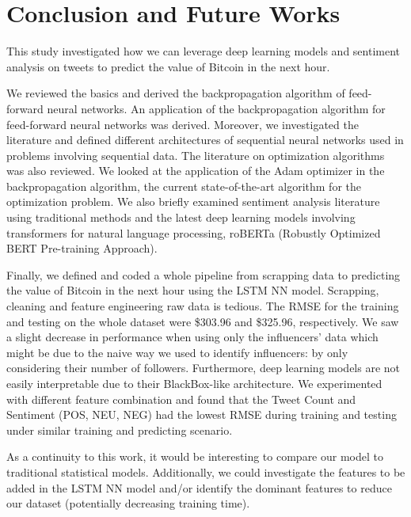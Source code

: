 \chapter{Conclusion and Future Works}

This study investigated how we can leverage deep learning models and sentiment analysis on tweets to predict the value of Bitcoin in the next hour. 

We reviewed the basics and derived the backpropagation algorithm of feed-forward neural networks. An application of the backpropagation algorithm for feed-forward neural networks was derived. Moreover, we investigated the literature and defined different architectures of sequential neural networks used in problems involving sequential data. The literature on optimization algorithms was also reviewed. We looked at the application of the Adam optimizer in the backpropagation algorithm, the current state-of-the-art algorithm for the optimization problem. We also briefly examined sentiment analysis literature using traditional methods and the latest deep learning models involving transformers for natural language processing, roBERTa (Robustly Optimized BERT Pre-training Approach).

Finally, we defined and coded a whole pipeline from scrapping data to predicting the value of Bitcoin in the next hour using the LSTM NN model. Scrapping, cleaning and feature engineering raw data is tedious. The RMSE for the training and testing on the whole dataset were \$303.96 and \$325.96, respectively. We saw a slight decrease in performance when using only the influencers' data which might be due to the naive way we used to identify influencers: by only considering their number of followers. Furthermore, deep learning models are not easily interpretable due to their BlackBox-like architecture. We experimented with different feature combination and found that the Tweet Count and Sentiment (POS, NEU, NEG) had the lowest RMSE during training and testing under similar training and predicting scenario.

As a continuity to this work, it would be interesting to compare our model to traditional statistical models. Additionally, we could investigate the features to be added in the LSTM NN model and/or identify the dominant features to reduce our dataset (potentially decreasing training time).